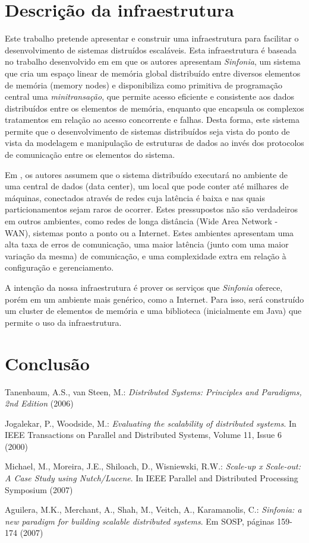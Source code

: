 \documentclass[a4paper,12pt]{report}
\begin{document}
\chapter{Descrição da infraestrutura}
Este trabalho pretende apresentar e construir uma infraestrutura para facilitar o desenvolvimento de sistemas distruídos escaláveis. Esta infraestrutura é baseada no trabalho desenvolvido em \cite{sinfonia} em que os autores apresentam {\em Sinfonia}, um sistema que cria um espaço linear de memória global distribuído entre diversos elementos de memória (memory nodes) e disponibiliza como primitiva de programação central uma {\em minitransação}, que permite acesso eficiente e consistente aos dados distribuídos entre os elementos de memória, enquanto que encapsula os complexos tratamentos em relação ao acesso concorrente e falhas. Desta forma, este sistema permite que o desenvolvimento de sistemas distribuídos seja vista do ponto de vista da modelagem e manipulação de estruturas de dados ao invés dos protocolos de comunicação entre os elementos do sistema.

Em \cite{sinfonia}, os autores assumem que o sistema distribuído executará no ambiente de uma central de dados (data center), um local que pode conter até milhares de máquinas, conectados através de redes cuja latência é baixa e nas quais particionamentos sejam raros de ocorrer. Estes pressupostos não são verdadeiros em outros ambientes, como redes de longa distância (Wide Area Network - WAN), sistemas ponto a ponto ou a Internet. Estes ambientes apresentam uma alta taxa de erros de comunicação, uma maior latência (junto com uma maior variação da mesma) de comunicação, e uma complexidade extra em relação à configuração e gerenciamento.

A intenção da nossa infraestrutura é prover os serviços que {\em Sinfonia} oferece, porém em um ambiente mais genérico, como a Internet. Para isso, será construído um cluster de elementos de memória e uma biblioteca (inicialmente em Java) que permite o uso da infraestrutura.
\chapter{Conclusão}

\begin{thebibliography}{99}

 Tanenbaum, A.S., van Steen, M.: {\em Distributed Systems: Principles and Paradigms, 2nd Edition} (2006)

 Jogalekar, P., Woodside, M.: {\em Evaluating the scalability of distributed systems}. In IEEE Transactions on Parallel and Distributed Systems, Volume 11, Issue 6 (2000)

 Michael, M., Moreira, J.E., Shiloach, D., Wisniewski, R.W.: {\em Scale-up x Scale-out: A Case Study using Nutch/Lucene}. In IEEE Parallel and Distributed Processing Symposium (2007)

 Aguilera, M.K., Merchant, A., Shah, M., Veitch, A., Karamanolis, C.: {\em Sinfonia: a new paradigm for building scalable distributed systems}. Em SOSP, páginas 159-174 (2007)

\end{thebibliography}
\end{document}
